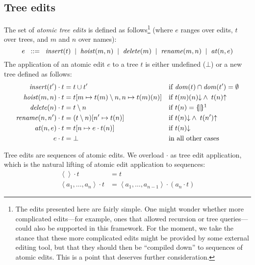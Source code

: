\subsection{Tree edits}
The set of {\em atomic tree edits} is defined as
follows\footnote{The edits presented here are fairly simple. One might
  wonder whether more complicated edits---for example, ones that allowed
  recursion or tree queries---could also be supported in this framework. For
  the moment, we take the stance that these more complicated edits might be
  provided by some external editing tool, but that they should then be
  ``compiled down'' to sequences of atomic edits.  This is a point that
  deserves further consideration.} (where $e$ ranges over edits, $t$ over
trees, and $m$ and $n$ over names):
\[
e \;\;::= \;\;
\mathit{insert}(t)  \;\;|\;\;
\mathit{hoist}(m,n) \;\;|\;\;
\mathit{delete}(m) \;\;|\;\;
\mathit{rename}(m,n) \;\;|\;\;
\mathit{at}(n,e)
\]
%
The application of an atomic edit $e$ to a tree $t$ is either undefined
($\bot$) or a new tree defined as follows:
\begin{align*}
    \Insert(t') \cdot t &=
        t \cup t' &&
        \mbox{if }\Domain(t)\cap\Domain(t')=\emptyset \\
    \Hoist(m,n) \cdot t &=
        t[m \To t(m) \Except n,n \To t(m)(n)] &&
        \mbox{if }t(m)(n)\Defined \land\; t(n)\Undefined \\
    \Delete(n) \cdot t &=
        t \Except n &&
        \mbox{if }t(n) = \Empty\footnotemark\\
    \Rename(n,n') \cdot t &=
        (t \Except n)[n' \To t(n)] &&
        \mbox{if }t(n)\Defined \land\; t(n')\Undefined \\
    \At(n,e) \cdot t &=
        t[n \To e \cdot t(n)] &&
        \mbox{if }t(n)\Defined \\
    e \cdot t &= \bot && \mbox{in all other cases}
\end{align*}

Tree edits are sequences of atomic edits. We overload $\cdot$ as tree
edit application, which is the natural lifting of atomic edit application to
sequences:
\begin{align*}
    \left<\right> \cdot t &= t \\
    \left<a_1,\ldots,a_n\right> \cdot t &=
        \left<a_1,\ldots,a_{n-1}\right>\cdot(a_n \cdot t)
\end{align*}


